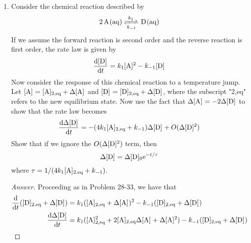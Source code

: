 \documentclass[../psets.tex]{subfiles}
\begin{document}
\begin{enumerate}[label={\textbf{28-\arabic*.}},leftmargin=3.5em]
\begin{proof}[Answer]
\begin{align*}
            \int_{\Delta\cnc[0]{P}}^{\Delta\cnc{P}}\frac{\dd{\Delta\cnc{P}}}{\Delta\cnc{P}} &= \int_0^t-\frac{\dd{t}}{\tau}\\
            \ln\frac{\Delta\cnc{P}}{\Delta\cnc[0]{P}} &= -\frac{t}{\tau}\\
            \Delta\cnc{P} &= \Delta\cnc[0]{P}\e[-t/\tau]
        \end{align*}
        where
        \begin{equation*}
            \tau = \frac{1}{k_1(\cnc[2,eq]{A}+\cnc[2,eq]{B})+k_{-1}}
        \end{equation*}
        as desired.
    \end{proof}
    \setcounter{enumi}{35}
    \item Consider the chemical reaction described by
    \begin{equation*}
        \ce{2A(aq) <=>[$k_1$][$k_{-1}$] D(aq)}
    \end{equation*}
    If we assume the forward reaction is second order and the reverse reaction is first order, the rate law is given by
    \begin{equation*}
        \dv{\cnc{D}}{t} = k_1\cnc{A}^2-k_{-1}\cnc{D}
    \end{equation*}
    Now consider the response of this chemical reaction to a temperature jump. Let $\cnc{A}=\cnc[2,eq]{A}+\Delta\cnc{A}$ and $\cnc{D}=\cnc[2,eq]{D}+\Delta\cnc{D}$, where the subscript "2,eq" refers to the new equilibrium state. Now use the fact that $\Delta\cnc{A}=-2\Delta\cnc{D}$ to show that the rate law becomes
    \begin{equation*}
        \dv{\Delta\cnc{D}}{t} = -(4k_1\cnc[2,eq]{A}+k_{-1})\Delta\cnc{D}+O(\Delta\cnc{D}^2)
    \end{equation*}
    Show that if we ignore the $O(\Delta\cnc{D}^2)$ term, then
    \begin{equation*}
        \Delta\cnc{D} = \Delta\cnc[0]{D}\e[-t/\tau]
    \end{equation*}
    where $\tau=1/(4k_1\cnc[2,eq]{A}+k_{-1})$.
    \begin{proof}[Answer]
        Proceeding as in Problem 28-33, we have that
        \begin{align*}
            \dv{t}(\cnc[2,eq]{D}+\Delta\cnc{D}) &= k_1(\cnc[2,eq]{A}+\Delta\cnc{A})^2-k_{-1}(\cnc[2,eq]{D}+\Delta\cnc{D})\\
            \dv{\Delta\cnc{D}}{t} &= k_1(\cnc[2,eq]{A}^2+2\cnc[2,eq]{A}\Delta\cnc{A}+\Delta\cnc{A}^2)-k_{-1}(\cnc[2,eq]{D}+\Delta\cnc{D})\\

\end{align*}
\end{proof}
\end{enumerate}
\end{document}
